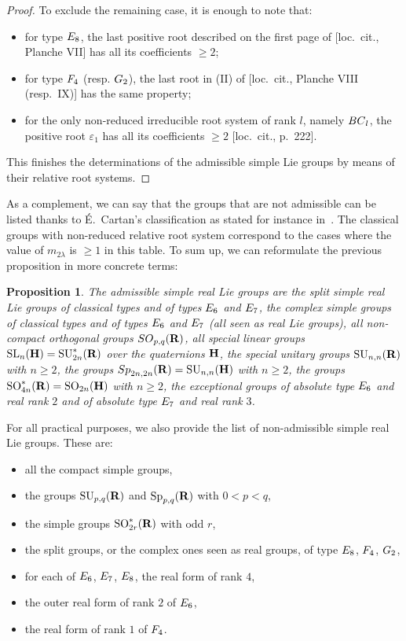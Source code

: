 \documentclass[11pt]{article}
\newtheorem{prop}[theo]{Proposition}
\theoremstyle{definition}
\numberwithin{equation}{section}
\numberwithin{figure}{section}
\numberwithin{table}{section}
\DeclareMathOperator{\SL}{SL}
\DeclareMathOperator{\SU}{SU}
\DeclareMathOperator{\SO}{SO}
\DeclareMathOperator{\Sp}{Sp}
\begin{document}
\begin{proof}
To exclude the remaining case, it is enough to note that:
\begin{itemize}
\item for type ${\rm E}_8$, the last positive root described on the first page of [loc.~cit., Planche VII] has all its coefficients $\geqslant 2$;
\item for type ${\rm F}_4$ (resp. ${\rm G}_2$), the last root in (II) of [loc.~cit., Planche VIII (resp.~IX)] has the same property;
\item for the only non-reduced irreducible root system of rank $l$, namely ${\rm BC}_l$, the positive root $\varepsilon_1$ has all its coefficients $\geqslant 2$ [loc.~cit., p.~222].
\end{itemize}
This finishes the determinations of the admissible simple Lie groups by means of their relative root systems.
\end{proof}

As a complement, we can say that the groups that are not admissible can be listed thanks to É.~Cartan's classification as stated for instance in~\cite[Table~VI, pp.~532--534]{Helgason}. The classical groups with non-reduced relative root system correspond to the cases where the value of $m_{2\lambda}$ is $\geqslant 1$ in this table. To sum up, we can reformulate the previous proposition in more concrete terms:

\begin{prop}
The admissible simple real Lie groups are the split simple real Lie groups of classical types and of types ${\rm E}_6$ and ${\rm E}_7$, the complex simple groups of classical types and of types ${\rm E}_6$ and ${\rm E}_7$ (all seen as real Lie groups), all non-compact orthogonal groups ${\rm SO}_{p,q}({\bf R})$, all special linear groups ${\SL}_n({\bf H}) = {\SU}^*_{2n}({\bf R})$ over the quaternions ${\bf H}$, the special unitary groups ${\SU}_{n,n}({\bf R})$ with $n \geqslant 2$, the groups ${\rm Sp}_{2n,2n}({\bf R}) = {\SU}_{n,n}({\bf H})$ with $n \geqslant 2$, the groups ${\SO}^*_{4n}({\bf R})={\SO}_{2n} ({\bf H})$ with $n \geqslant 2$, the exceptional groups of absolute type ${\rm E}_6$ and real rank $2$ and of absolute type ${\rm E}_7$ and real rank $3$.
\end{prop}

For all practical purposes, we also provide the list of non-admissible simple real Lie groups. These are:
\begin{itemize}
\item all the compact simple groups,
\item the groups ${\SU}_{p,q}({\bf R})$ and ${\Sp}_{p,q}({\bf R})$ with $0<p<q$,
\item the simple groups ${\SO}^*_{2r}({\bf R})$ with odd $r$,
\item the split groups, or the complex ones seen as real groups, of type ${\rm E}_8$, ${\rm F}_4$, ${\rm G}_2$,
\item for each of ${\rm E}_6$, ${\rm E}_7$, ${\rm E}_8$, the real form of rank $4$,
\item the outer real form of rank $2$ of ${\rm E}_6$,
\item the real form of rank $1$ of ${\rm F}_4$.
\end{itemize}
\end{document}
